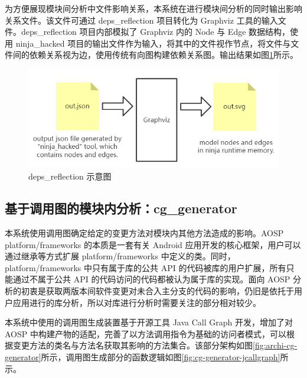 为方便展现模块间分析中文件影响关系，本系统在进行模块间分析的同时输出影响关系文件。该文件可通过 deps\_reflection 项目转化为 Graphviz 工具的输入文件。deps\_reflection 项目内部模拟了 Graphviz 内的 Node 与 Edge 数据结构，使用 ninja\_hacked 项目的输出文件作为输入，将其中的文件视作节点，将文件与文件间的依赖关系视为边，使用传统有向图构建依赖关系图。输出结果如图\ref{fig:archi-deps-reflection}所示。

\begin{figure}[htb]
    \centering
    \includegraphics[width=.9\textwidth]{figures/archi-deps-reflection.png}
    \caption{deps\_reflection 示意图}
    \label{fig:archi-deps-reflection}
\end{figure}

\subsection{基于调用图的模块内分析：cg\_generator}

本系统使用调用图确定给定的变更方法对模块内其他方法造成的影响。AOSP platform/frameworks 的本质是一套有关 Android 应用开发的核心框架，用户可以通过继承等方式扩展 platform/frameworks 中定义的类。同时，platform/frameworks 中只有属于库的公共 API 的代码被库的用户扩展，所有只能通过不属于公共 API 的代码访问的代码都被认为属于库的实现。\cite{CALLGRAPHCONSTRUCTION}面向 AOSP 分析的初衷是获取两版本间软件变更对未合入主分支的代码的影响，仍旧是依托于用户应用进行的库分析，所以对库进行分析时需要关注的部分相对较少。

本系统中使用的调用图生成装置基于开源工具 Java Call Graph 开发，增加了对 AOSP 中构建产物的适配，完善了以方法调用指令为基础的访问者模式，可以根据变更方法的类名与方法名获取其影响的方法集合。该部分架构如图\ref{fig:archi-cg-generator}所示，调用图生成部分的函数逻辑如图\ref{fig:cg-generator-jcallgraph}所示。

